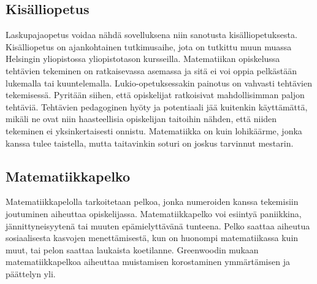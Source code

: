 \subsection{Kisälliopetus}
Laskupajaopetus voidaa nähdä sovelluksena niin sanotusta kisälliopetuk\-sesta. Kisälliopetus on ajankohtainen tutkimusaihe, jota on tutkittu muun muassa Helsingin yliopistossa yliopistotason kursseilla. Matematiikan opiske\-lussa tehtävien tekeminen on ratkaisevassa asemassa ja sitä ei voi oppia pelkästään lukemalla tai kuuntelemalla. Lukio-opetuksessakin painotus on vahvasti tehtävien tekemisessä. Pyritään siihen, että opiskelijat ratkoisivat mahdollisimman paljon tehtäviä. Tehtävien pedagoginen hyöty ja potentiaali jää kuitenkin käyttämättä, mikäli ne ovat niin haasteellisia opiskelijan taitoihin nähden, että niiden tekeminen ei yksinkertaisesti onnistu. Mate\-ma\-tiikka on kuin lohikäärme, jonka kanssa tulee taistella, mutta taitavinkin soturi on joskus tarvinnut mestarin.
\subsection{Matematiikkapelko}
Matematiikkapelolla tarkoitetaan pelkoa, jonka numeroiden kanssa tekemisiin joutuminen aiheuttaa opiskelijassa.
Matematiikkapelko voi esiintyä paniikkina, jännittyneisyytenä tai muuten epämielyttävänä tunteena.
Pelko saattaa aiheutua sosiaalisesta kasvojen menettämisestä, kun on huonompi matematiikassa kuin muut, tai pelon saattaa laukaista koetilanne.\cite{makkonen}\cite{mathanx}
Greenwoodin mukaan matematiikkapelkoa aiheuttaa muistamisen korostaminen ymmärtämisen ja päättelyn yli.\cite{greenwood}

